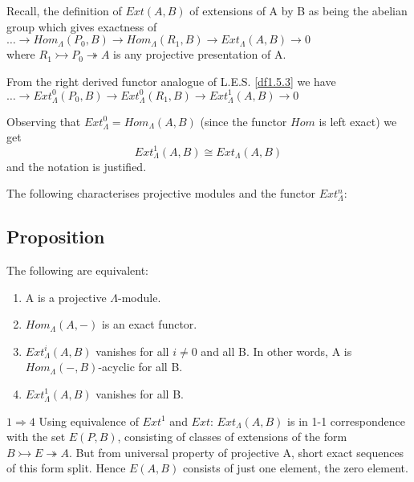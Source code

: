 Recall, the definition of $Ext(A,B)$ of extensions of A by B as
being the abelian group which gives exactness of \\
$\dots \rightarrow Hom_\Lambda(P_0,B)\rightarrow
Hom_\Lambda(R_1,B)\rightarrow Ext_\Lambda(A,B)\rightarrow 0$
\\
where $R_1\rightarrowtail P_0\twoheadrightarrow A$ is any
projective presentation of A.

From the right derived functor analogue of L.E.S. \ref{df1.5.3} we
have \\
$\dots \rightarrow Ext^0_\Lambda(P_0,B)\rightarrow
Ext^0_\Lambda(R_1,B)\rightarrow Ext^1_\Lambda(A,B)\rightarrow 0$

Observing that $Ext^0_\Lambda = Hom_\Lambda (A,B)$ (since the
functor $Hom$ is left exact) we get
$$Ext^1_\Lambda (A,B) \cong Ext_\Lambda (A,B)$$ and the notation
is justified.

The following characterises projective modules and the functor
$Ext^n_\Lambda$:

\subsection{Proposition}\label{1.6.2}
The following are equivalent:
\begin{enumerate}
    \item A is a projective $\Lambda$-module.
    \item $Hom_\Lambda (A,-)$ is an exact functor.
    \item $Ext^i_\Lambda (A,B)$ vanishes for all $i\neq 0$ and all
    B. In other words, A is \\ $Hom_\Lambda (-,B)$-acyclic for all
    B.
    \item $Ext_\Lambda^1 (A,B)$ vanishes for all B.
\end{enumerate}

\textbf{$1\Longrightarrow 4$} Using equivalence of $Ext^1$ and
$Ext$: $Ext_\Lambda(A,B)$ is in 1-1 correspondence with the set
$E(P,B)$, consisting of classes of extensions of the form
$B\rightarrowtail E\twoheadrightarrow A$. But from universal
property of projective A, short exact sequences of this form
split. Hence $E(A,B)$ consists of just one element, the zero
element.


